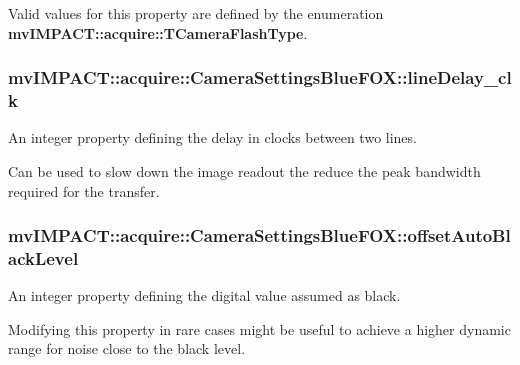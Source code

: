 Valid values for this property are defined by the enumeration {\bfseries mv\+I\+M\+P\+A\+C\+T\+::acquire\+::\+T\+Camera\+Flash\+Type}. \hypertarget{classmv_i_m_p_a_c_t_1_1acquire_1_1_camera_settings_blue_f_o_x_a3046edfaab3f6f0f909d8ebd4fa0c4c0}{
\subsubsection[{line\+Delay\+\_\+clk}]{ mv\+I\+M\+P\+A\+C\+T\+::acquire\+::\+Camera\+Settings\+Blue\+F\+O\+X\+::line\+Delay\+\_\+clk}}\label{classmv_i_m_p_a_c_t_1_1acquire_1_1_camera_settings_blue_f_o_x_a3046edfaab3f6f0f909d8ebd4fa0c4c0}


An integer property defining the delay in clocks between two lines. 

Can be used to slow down the image readout the reduce the peak bandwidth required for the transfer. \hypertarget{classmv_i_m_p_a_c_t_1_1acquire_1_1_camera_settings_blue_f_o_x_adcd01df795b09dba9257c30470abba50}{
\subsubsection[{offset\+Auto\+Black\+Level}]{ mv\+I\+M\+P\+A\+C\+T\+::acquire\+::\+Camera\+Settings\+Blue\+F\+O\+X\+::offset\+Auto\+Black\+Level}}\label{classmv_i_m_p_a_c_t_1_1acquire_1_1_camera_settings_blue_f_o_x_adcd01df795b09dba9257c30470abba50}


An integer property defining the digital value assumed as black. 

Modifying this property in rare cases might be useful to achieve a higher dynamic range for noise close to the black level.


